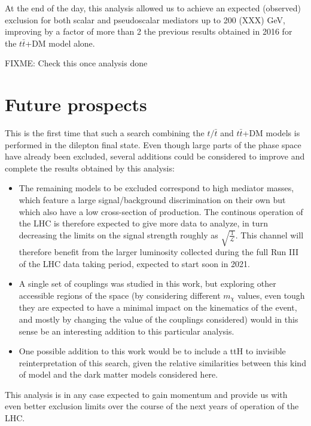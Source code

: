 \documentclass[a4paper, 10pt, openright]{report}
\begin{document}
At the end of the day, this analysis allowed us to achieve an expected (observed) exclusion for both scalar and pseudoscalar mediators up to 200 (XXX) GeV, improving by a factor of more than 2 the previous results obtained in 2016 for the $t \bar t$+DM model alone.

\color{red} FIXME: Check this once analysis done \color{black}

\section{Future prospects}

This is the first time that such a search combining the $t/\bar t$ and $t \bar t$+DM models is performed in the dilepton final state. Even though large parts of the phase space have already been excluded, several additions could be considered to improve and complete the results obtained by this analysis:

\begin{itemize}
\item The remaining models to be excluded correspond to high mediator masses, which feature a large signal/background discrimination on their own but which also have a low cross-section of production. The continous operation of the \ac{LHC} is therefore expected to give more data to analyze, in turn decreasing the limits on the signal strength roughly as $\sqrt{\frac{1}{\mathcal{L}}}$. This channel will therefore benefit from the larger luminosity collected during the full Run III of the LHC data taking period, expected to start soon in 2021.
\item A single set of couplings was studied in this work, but exploring other accessible regions of the space (by considering different $m_\chi$ values, even tough they are expected to have a minimal impact on the kinematics of the event, and mostly by changing the value of the couplings considered) would in this sense be an interesting addition to this particular analysis.
\item One possible addition to this work would be to include a ttH to invisible reinterpretation of this search, given the relative similarities between this kind of model and the dark matter models considered here. 
\end{itemize}

This analysis is in any case expected to gain momentum and provide us with even better exclusion limits over the course of the next years of operation of the \ac{LHC}.
\end{document}
